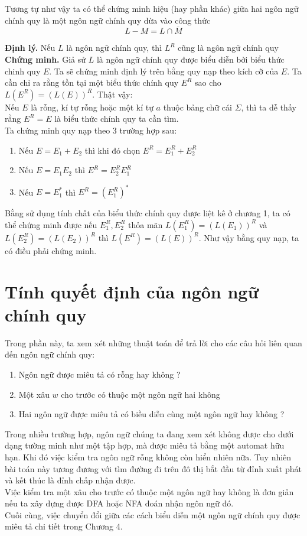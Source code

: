 \documentclass[14pt]{extreport}
\begin{document}
Tương tự như vậy ta có thể chứng minh hiệu (hay phần khác) giữa hai ngôn ngữ chính quy là một ngôn ngữ chính quy dừa vào công thức
$$L - M = L \cap \overline{M}$$

\textbf{Định lý.} Nếu $L$ là ngôn ngữ chính quy, thì $L^R$ cũng là ngôn ngữ chính quy\\

\textbf{Chứng minh.} Giả sử $L$ là ngôn ngữ chính quy được biểu diễn bởi biểu thức chinh quy $E$. Ta sẽ chứng minh định lý trên bằng quy nạp theo kích cỡ của $E$. Ta cần chỉ ra rằng tồn tại một biểu thức chính quy $E^R$ sao cho $L(E^R) = (L(E))^R$. Thật vậy:\\

Nếu $E$ là rỗng, kí tự rỗng hoặc một kí tự $a$ thuộc bảng chữ cái $\Sigma$, thì ta dễ thấy rằng $E^R = E$ là biểu thức chính quy ta cần tìm. \\

Ta chứng minh quy nạp theo 3 trường hợp sau:
\begin{enumerate}
\item Nếu $E = E_1 + E_2$ thì khi đó chọn $E^R = E_1^R + E_2^R$
\item Nếu $E = E_1 E_2$ thì $E^R = E_2^R E_1^R$
\item Nếu $E = E_1^*$ thì $E^R = (E_1^R)^*$
\end{enumerate}

Bằng sử dụng tính chất của biểu thức chính quy được liệt kê ở chương 1, ta có thể chứng minh được nếu $E_1^R, E_2^R$ thỏa mãn $L(E_1^R) = (L(E_1))^R$ và $L(E_2^R) = (L(E_2))^R$ thì $L(E^R) = (L(E))^R$. Như vậy bằng quy nạp, ta có điều phải chứng minh.
\section{Tính quyết định của ngôn ngữ chính quy}
Trong phần này, ta xem xét những thuật toán để trả lời cho các câu hỏi liên quan đến ngôn ngữ chính quy:
\begin{enumerate}
\item Ngôn ngữ được miêu tả có rỗng hay không ?
\item Một xâu $w$ cho trước có thuộc một ngôn ngữ hai không
\item Hai ngôn ngữ được miêu tả có biều diễn cùng một ngôn ngữ hay không ?
\end{enumerate}
Trong nhiều trường hợp, ngôn ngữ chúng ta đang xem xét không được cho dưới dạng tường minh như một tập hợp, mà được miêu tả bằng một automat hữu hạn. Khi đó việc kiểm tra ngôn ngữ rỗng không còn hiển nhiên nữa. Tuy nhiên bài toán này tương đương với tìm đường đi trên đô thị bắt đầu từ đỉnh xuất phát và kết thúc là đỉnh chấp nhận được.\\
Việc kiểm tra một xâu cho trước có thuộc một ngôn ngữ hay không là đơn giản nếu ta xây dựng được DFA hoặc NFA đoán nhận ngôn ngữ đó.\\
Cuối cùng, việc chuyển đổi giữa các cách biểu diễn một ngôn ngữ chính quy được miêu tả chi tiết trong Chương 4.
\end{document}
